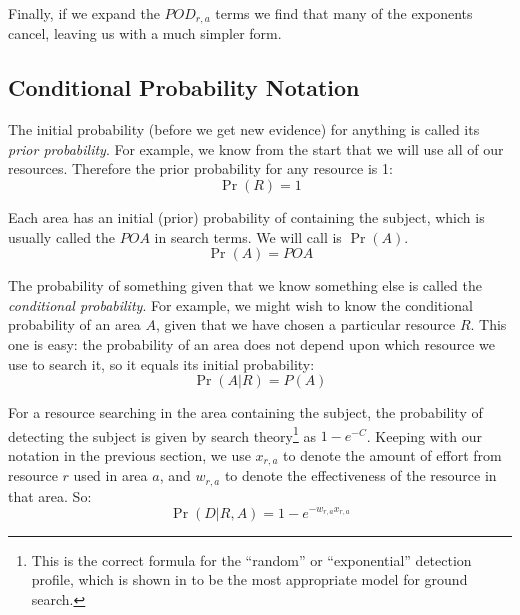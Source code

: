 \documentclass[10pt]{article}
\begin{document}
Finally, if we expand the $POD_{r,a}$ terms we find that many of the
exponents cancel, leaving us with a much simpler form.


\subsection{Conditional Probability Notation}
\label{sec:Cond-Prob-Notat}

The initial probability (before we get new evidence) for anything is
called its \emph{prior probability}. For example, we know from the
start that we will use all of our resources. Therefore the prior
probability for any resource is 1:
\begin{equation}
  \label{eq:p(r)}
  \Pr(R) = 1
\end{equation}

Each area has an initial (prior) probability of containing the
subject, which is usually called the $POA$ in search terms. We will
call is $\Pr(A)$.
\begin{equation}
  \label{eq:p(a)}
  \Pr(A) = POA
\end{equation}

The probability of something given that we know something else is
called the \emph{conditional probability}. For example, we might wish
to know the conditional probability of an area $A$, given that we have
chosen a particular resource $R$. This one is easy: the probability of
an area does not depend upon which resource we use
to search it, so it equals its initial probability:
\begin{equation}
  \label{eq:p(a|r)}
  \Pr(A|R) = P(A)
\end{equation}

For a resource searching in the area containing the subject, the
probability of detecting the subject is given by search
theory\footnote{This is the correct formula for the ``random'' or
  ``exponential'' detection profile, which is shown in \cite{} to be
  the most appropriate model for ground search.}
as $1 - e^{-C}$. Keeping with our notation in the previous section, we
use $x_{r,a}$ to denote the amount of effort from resource $r$ used in
area $a$, and $w_{r,a}$ to denote the effectiveness of the resource in
that area. So:
\begin{equation}
  \label{eq:4}
  \Pr(D|R,A) = 1 - e^{-w_{r,a} x_{r,a}}
\end{equation}
\end{document}
